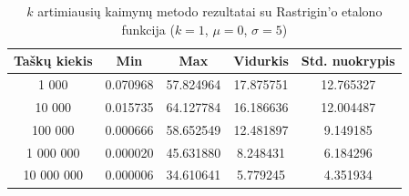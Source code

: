 \begin{table}[H]
    \centering
    \begin{tabular}{|c|c|c|c|c|}
        \hline
        \textbf{Taškų kiekis} & \textbf{Min} & \textbf{Max} & \textbf{Vidurkis} & \textbf{Std. nuokrypis} \\ \hline
        1 000        & 0.070968 & 57.824964 & 17.875751 & 12.765327 \\ \hline
        10 000       & 0.015735 & 64.127784 & 16.186636 & 12.004487 \\ \hline
        100 000      & 0.000666 & 58.652549 & 12.481897 & 9.149185 \\ \hline
        1 000 000    & 0.000020 & 45.631880 & 8.248431 & 6.184296 \\ \hline
        10 000 000   & 0.000006 & 34.610641 & 5.779245 & 4.351934 \\ \hline
    \end{tabular}
    \caption{$k$ artimiausių kaimynų metodo rezultatai su Rastrigin'o etalono funkcija ($k = 1$, $\mu = 0$, $\sigma = 5$)}
\end{table}
